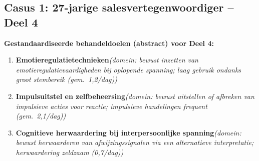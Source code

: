 \documentclass[11pt,a4paper]{article}
\begin{document}
\newpage
\subsection*{Casus 1: 27-jarige salesvertegenwoordiger -- Deel 4}

\begin{contextbox}
\small\textbf{Gestandaardiseerde behandeldoelen (abstract) voor Deel 4:}
\begin{enumerate}[topsep=2pt,itemsep=1pt,label=\arabic*.]
\item \textbf{Emotieregulatietechnieken}\quad\textit{\small (domein: bewust inzetten van emotieregulatievaardigheden bij oplopende spanning; laag gebruik ondanks groot stembereik (gem.\ 1,2/dag))}
\item \textbf{Impulsuitstel en zelfbeheersing}\quad\textit{\small (domein: bewust uitstellen of afbreken van impulsieve acties voor reactie; impulsieve handelingen frequent (gem.\ 2,1/dag))}
\item \textbf{Cognitieve herwaardering bij interpersoonlijke spanning}\quad\textit{\small (domein: bewust herwaarderen van afwijzingssignalen via een alternatieve interpretatie; herwaardering zeldzaam (0,7/dag))}
\end{enumerate}
\end{contextbox}
\end{document}
